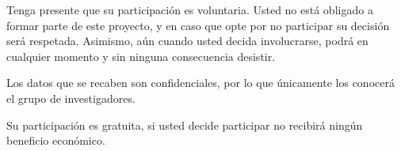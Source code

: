 Tenga presente que su participación es voluntaria. Usted no está obligado a formar parte de este proyecto, y en caso que opte por no participar su decisión será respetada. Asimismo, aún cuando usted decida involucrarse, podrá en cualquier momento y sin ninguna consecuencia desistir.

Los datos que se recaben son confidenciales, por lo que únicamente los conocerá el grupo de investigadores.

Su participación es gratuita, si usted decide participar no recibirá ningún beneficio económico.
